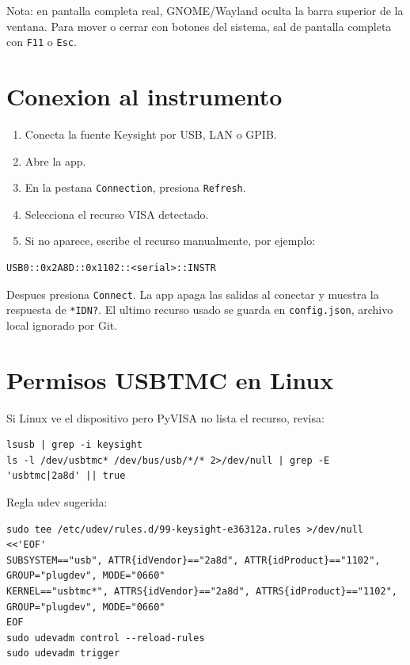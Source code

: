\documentclass[11pt,letterpaper]{article}
\begin{document}
Nota: en pantalla completa real, GNOME/Wayland oculta la barra superior de la
ventana. Para mover o cerrar con botones del sistema, sal de pantalla completa
con \texttt{F11} o \texttt{Esc}.

\section{Conexion al instrumento}

\begin{enumerate}
  \item Conecta la fuente Keysight por USB, LAN o GPIB.
  \item Abre la app.
  \item En la pestana \texttt{Connection}, presiona \texttt{Refresh}.
  \item Selecciona el recurso VISA detectado.
  \item Si no aparece, escribe el recurso manualmente, por ejemplo:
\end{enumerate}

\begin{verbatim}
USB0::0x2A8D::0x1102::<serial>::INSTR
\end{verbatim}

Despues presiona \texttt{Connect}. La app apaga las salidas al conectar y
muestra la respuesta de \texttt{*IDN?}. El ultimo recurso usado se guarda en
\texttt{config.json}, archivo local ignorado por Git.

\section{Permisos USBTMC en Linux}

Si Linux ve el dispositivo pero PyVISA no lista el recurso, revisa:

\begin{verbatim}
lsusb | grep -i keysight
ls -l /dev/usbtmc* /dev/bus/usb/*/* 2>/dev/null | grep -E 'usbtmc|2a8d' || true
\end{verbatim}

Regla udev sugerida:

\begin{verbatim}
sudo tee /etc/udev/rules.d/99-keysight-e36312a.rules >/dev/null <<'EOF'
SUBSYSTEM=="usb", ATTR{idVendor}=="2a8d", ATTR{idProduct}=="1102", GROUP="plugdev", MODE="0660"
KERNEL=="usbtmc*", ATTRS{idVendor}=="2a8d", ATTRS{idProduct}=="1102", GROUP="plugdev", MODE="0660"
EOF
sudo udevadm control --reload-rules
sudo udevadm trigger
\end{verbatim}
\end{document}
